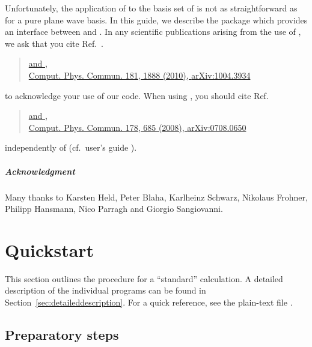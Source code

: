 Unfortunately, the application of \wannier to the \lapw basis set of
\wien is not as straightforward as for a pure plane wave basis.  In
this guide, we describe the package \wtow which provides an interface
between \wien and \wannier.  In any scientific publications arising
from the use of \wtow, we ask that you cite Ref.~\cite{w2w}.
%
\begin{quote}
  \href{http://www.sciencedirect.com/science/article/pii/S0010465510002948}{
    and ,\\
    Comput. Phys. Commun. 181, 1888 (2010),
  }
  \href{http://arxiv.org/abs/1004.3934}{arXiv:1004.3934}
\end{quote}
%
to acknowledge your use of our code.  When using \wannier, you should
cite Ref.~\cite{wannier90_orig}
%
\begin{quote}
  \href{http://www.sciencedirect.com/science/article/pii/S0010465507004936}{
    and ,\\
    Comput. Phys. Commun. 178, 685 (2008),
  }
  \href{http://arxiv.org/abs/0708.0650}{arXiv:0708.0650}
\end{quote}
%
independently of \wtow (cf.~\wannier user's guide \cite{wannier90}).

\paragraph{Acknowledgment}
%
Many thanks to Karsten Held, Peter Blaha, Karlheinz Schwarz, Nikolaus
Frohner, Philipp Hansmann, Nico Parragh and Giorgio Sangiovanni.


\tableofcontents

\mainmatter


\chapter{Quickstart}
\label{sec:quickstart}
\minitoc

This section outlines the procedure for a ``standard'' \wtow
calculation.  A detailed description of the individual programs can be
found in Section~\ref{sec:detaileddescription}.  For a quick
reference, see the plain-text file .


\section{Preparatory steps}
\label{sec:quickstart_prep}

